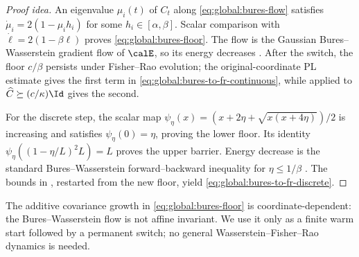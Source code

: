 \begin{proof}[Proof idea]
An eigenvalue \(\mu_i(t)\) of \(C_t\) along \eqref{eq:global:bures-flow} satisfies
\(
\dot\mu_i=2(1-\mu_i h_i)
\) for some \(h_i\in[\alpha,\beta]\).  Scalar comparison with
\(
\dot\ell=2(1-\beta\ell)
\) proves \eqref{eq:global:bures-floor}.  The flow is the Gaussian Bures--Wasserstein gradient flow
of \(\calE\), so its energy decreases \citep{lambert2022variational}.  After the switch, the floor
\(c/\beta\) persists under Fisher--Rao evolution; the original-coordinate PL estimate gives the
first term in \eqref{eq:global:bures-to-fr-continuous}, while
 applied to
\(
\widehat C\succeq(c/\kappa)\Id
\) gives the second.

For the discrete step, the scalar map
\(
\psi_\eta(x)=(x+2\eta+\sqrt{x(x+4\eta)})/2
\) is increasing and satisfies \(\psi_\eta(0)=\eta\), proving the lower floor.  Its identity
\(
\psi_\eta((1-\eta/L)^2L)=L
\) proves the upper barrier.  Energy decrease is the standard Bures--Wasserstein
forward--backward inequality for \(\eta\leq1/\beta\) \citep{diao2023forward}.  The bounds in
, restarted from the new floor, yield
\eqref{eq:global:bures-to-fr-discrete}.
\end{proof}

The additive covariance growth in \eqref{eq:global:bures-floor} is coordinate-dependent:
the Bures--Wasserstein flow is not affine invariant.  We use it only as a finite warm start
followed by a permanent switch; no general Wasserstein--Fisher--Rao dynamics is needed.


